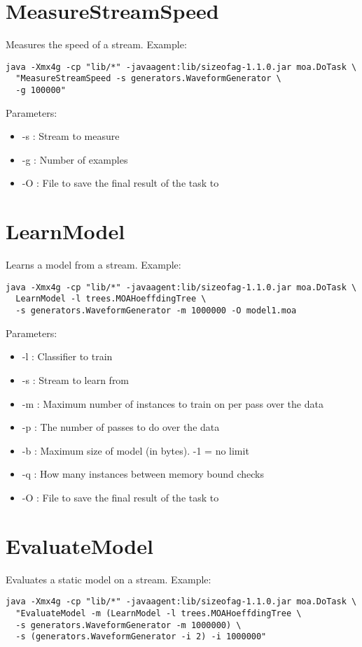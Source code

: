 \documentclass[a4paper,12pt,twoside]{book}
\begin{document}
\section{MeasureStreamSpeed} 
Measures the speed of a stream. Example:

\begin{footnotesize}\begin{verbatim}
java -Xmx4g -cp "lib/*" -javaagent:lib/sizeofag-1.1.0.jar moa.DoTask \
  "MeasureStreamSpeed -s generators.WaveformGenerator \
  -g 100000" 
\end{verbatim}\end{footnotesize}

Parameters:
\begin{itemize}
\item -s : Stream to measure
\item -g : Number of examples
\item -O : File to save the final result of the task to
\end{itemize}

\section{LearnModel} 
Learns a model from a stream.
Example:
\begin{footnotesize}\begin{verbatim}
java -Xmx4g -cp "lib/*" -javaagent:lib/sizeofag-1.1.0.jar moa.DoTask \
  LearnModel -l trees.MOAHoeffdingTree \
  -s generators.WaveformGenerator -m 1000000 -O model1.moa
\end{verbatim}\end{footnotesize}

Parameters:
\begin{itemize}
\item -l : Classifier to train
\item -s : Stream to learn from
\item -m : Maximum number of instances to train on per pass over the data
\item -p : The number of passes to do over the data
\item -b : Maximum size of model (in bytes). -1 = no limit
\item -q : How many instances between memory bound checks
\item -O : File to save the final result of the task to
\end{itemize}

\section{EvaluateModel} 
Evaluates a static model on a stream.
Example:
\begin{footnotesize}\begin{verbatim}
java -Xmx4g -cp "lib/*" -javaagent:lib/sizeofag-1.1.0.jar moa.DoTask \
  "EvaluateModel -m (LearnModel -l trees.MOAHoeffdingTree \
  -s generators.WaveformGenerator -m 1000000) \
  -s (generators.WaveformGenerator -i 2) -i 1000000"
\end{verbatim}\end{footnotesize}
\end{document}
